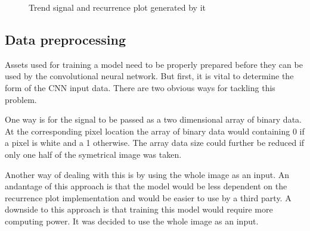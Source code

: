 \documentclass[a4paper,12pt,fleqn]{article}
\begin{document}
\begin{figure}
  \centering
  \qquad
  \caption{Trend signal and recurrence plot generated by it}
  \label{fig:generated_trend}
\end{figure}


\subsection{Data preprocessing}
Assets used for training a model need to be properly prepared before they can be used by the convolutional neural network.
But first, it is vital to determine the form of the CNN input data.
There are two obvious ways for tackling this problem.

One way is for the signal to be passed as a two dimensional array of binary data.
At the corresponding pixel location the array of binary data would containing 0 if a pixel is white and a 1 otherwise.
The array data size could further be reduced if only one half of the symetrical image was taken.

Another way of dealing with this is by using the whole image as an input.
An andantage of this approach is that the model would be less dependent on the recurrence plot implementation and would be easier to use by a third party.
A downside to this approach is that training this model would require more computing power. It was decided to use the whole image as an input.
\end{document}
